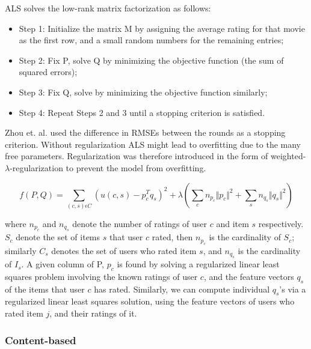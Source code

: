 ALS solves the low-rank matrix factorization as follows:

\begin{itemize}
\item Step 1: Initialize the matrix M by assigning the average rating for that movie as the first row, and a small random numbers for the remaining entries;
\item Step 2: Fix P, solve Q by minimizing the objective function (the sum of squared errors);
\item Step 3: Fix Q, solve by minimizing the objective function similarly;
\item Step 4: Repeat Steps 2 and 3 until a stopping criterion is satisfied.
\end{itemize}

Zhou et. al. \cite{Zhou2008} used the difference in RMSEs between the rounds as a stopping criterion. Without regularization ALS might lead to overfitting due to the many free parameters. Regularization was therefore introduced in the form of weighted-$\lambda$-regularization to prevent the model from overfitting.

\begin{equation}
f(P, Q) = \sum_{(c,s)\epsilon C} (u(c,s) - p^{T}_{c}q_{s})^{2} + \lambda (\sum_{c} n_{p_{c}} \Vert p_{c} \Vert ^{2} + \sum_{s} n_{q_{s}} \Vert q_{s} \Vert ^{2})
\label{WeightedLamba}
\end{equation}

where $n_{p_{c}}$ and $n_{q_{s}}$ denote the number of ratings of user $c$ and item $s$ respectively. $S_{c}$ denote the set of items $s$ that user $c$ rated, then $n_{p_{c}}$ is the cardinality of $S_{c}$; similarly $C_{s}$ denotes the set of users who rated item $s$, and $n_{q_{s}}$ is the cardinality of $I_{s}$. A given column of P, $p_{c}$ is found by solving a regularized linear least squares problem involving the known ratings of user $c$, and the feature vectors $q_{s}$ of the items that user $c$ has rated. Similarly, we can compute individual $q_{s}$'s via a regularized linear least squares solution, using the feature vectors of users who rated item $j$, and their ratings of it.


\subsubsection{Content-based}

